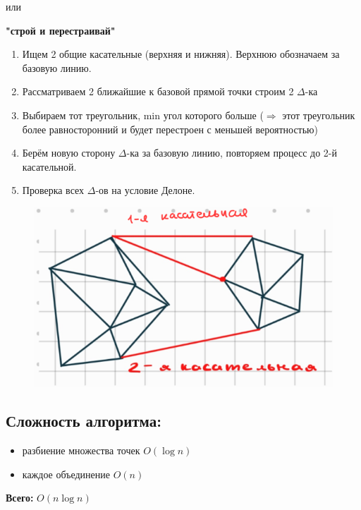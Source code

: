 или 

\textbf{"строй и перестраивай"} 
\begin{enumerate}
	\item Ищем 2 общие касательные (верхняя и нижняя).
	Верхнюю обозначаем за базовую линию. 
	\item Рассматриваем 2 ближайшие к базовой прямой точки 
	строим 2 $\Delta$-ка 
	\item Выбираем тот треугольник, min угол которого больше 
	($\Rightarrow$ этот треугольник более равносторонний и будет перестроен с меньшей вероятностью) 
	\item Берём новую сторону $\Delta$-ка за базовую линию, повторяем процесс до 2-й касательной. 
	\item Проверка всех $\Delta$-ов на условие Делоне. 
\end{enumerate}

\begin{figure}[h!]
	\centering
	\includegraphics[width=0.4\linewidth]{img/14_4.png}
	\captionsetup{labelformat=empty}
	\caption{}
\end{figure}

\subsection*{Сложность алгоритма:} 
\begin{itemize}
	\item разбиение множества точек $O(\log n)$ 
	\item каждое объединение $O(n)$ 
\end{itemize}
\textbf{Всего:} $O(n \log n)$